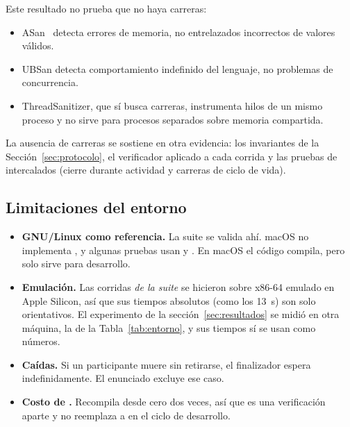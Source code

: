 Este resultado no prueba que no haya carreras:
\begin{itemize}
  \item ASan~\cite{Serebryany2012} detecta errores de memoria, no
  entrelazados incorrectos de valores válidos.
  \item UBSan detecta comportamiento indefinido del lenguaje, no problemas
  de concurrencia.
  \item ThreadSanitizer, que sí busca carreras, instrumenta hilos de un
  mismo proceso y no sirve para procesos separados sobre memoria
  compartida.
\end{itemize}
La ausencia de carreras se sostiene en otra evidencia: los invariantes de
la Sección~\ref{sec:protocolo}, el verificador  aplicado a cada
corrida y las pruebas de intercalados (cierre durante actividad y
carreras de ciclo de vida).

\subsection{Limitaciones del entorno}

\begin{itemize}
  \item \textbf{GNU/Linux como referencia.} La suite se valida ahí. macOS
  no implementa , y algunas pruebas
  usan  y . En macOS el código compila,
  pero solo sirve para desarrollo.
  \item \textbf{Emulación.} Las corridas \emph{de la suite} se hicieron
  sobre x86-64 emulado en Apple Silicon, así que sus tiempos absolutos
  (como los 13~s) son solo orientativos. El experimento de la
  sección~\ref{sec:resultados} se midió en otra máquina, la de la
  Tabla~\ref{tab:entorno}, y sus tiempos sí se usan como números.
  \item \textbf{Caídas.} Si un participante muere sin retirarse, el
  finalizador espera indefinidamente. El enunciado excluye ese caso.
  \item \textbf{Costo de .} Recompila desde cero dos veces,
  así que es una verificación aparte y no reemplaza a  en el
  ciclo de desarrollo.
\end{itemize}
